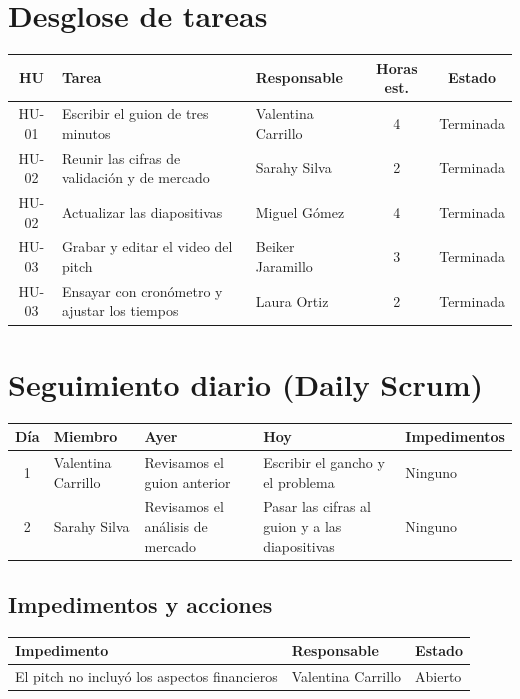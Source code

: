 \documentclass[11pt,a4paper]{article}
\begin{document}
\section{Desglose de tareas}

\begin{tabularx}{\textwidth}{c X l c c}
  \toprule
  \textbf{HU} & \textbf{Tarea} & \textbf{Responsable} & \textbf{Horas est.} & \textbf{Estado} \\
  \midrule
  HU-01 & Escribir el guion de tres minutos & Valentina Carrillo & 4 & Terminada \\
  HU-02 & Reunir las cifras de validación y de mercado & Sarahy Silva & 2 & Terminada \\
  HU-02 & Actualizar las diapositivas & Miguel Gómez & 4 & Terminada \\
  HU-03 & Grabar y editar el video del pitch & Beiker Jaramillo & 3 & Terminada \\
  HU-03 & Ensayar con cronómetro y ajustar los tiempos & Laura Ortiz & 2 & Terminada \\
  \bottomrule
\end{tabularx}

\section{Seguimiento diario (Daily Scrum)}

\begin{tabularx}{\textwidth}{c l X X X}
  \toprule
  \textbf{Día} & \textbf{Miembro} & \textbf{Ayer} & \textbf{Hoy} & \textbf{Impedimentos} \\
  \midrule
  1 & Valentina Carrillo & Revisamos el guion anterior & Escribir el gancho y el problema & Ninguno \\
  2 & Sarahy Silva & Revisamos el análisis de mercado & Pasar las cifras al guion y a las diapositivas & Ninguno \\
  \bottomrule
\end{tabularx}

\subsection{Impedimentos y acciones}

\begin{tabularx}{\textwidth}{X l l}
  \toprule
  \textbf{Impedimento} & \textbf{Responsable} & \textbf{Estado} \\
  \midrule
  El pitch no incluyó los aspectos financieros & Valentina Carrillo & Abierto \\
  \bottomrule
\end{tabularx}
\end{document}
